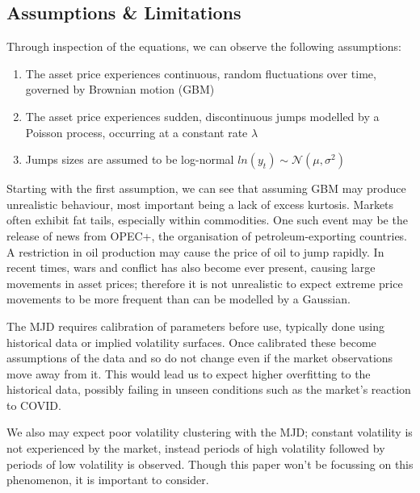 \documentclass[12pt]{article}
\newcommand{\newp}
    {
    \vskip 0.5cm 
  }
\numberwithin{equation}{section}
\begin{document}
\subsection{Assumptions \& Limitations}
Through inspection of the equations, we can observe the following assumptions\autocite{viewonmerton}:
\begin{enumerate}
\item The asset price experiences continuous, random fluctuations over time,
  governed by Brownian motion (GBM)
\item The asset price experiences sudden, discontinuous jumps modelled by a 
  Poisson process, occurring at a constant rate $\lambda$
\item Jumps sizes are assumed to be log-normal $ln(y_t) \sim \mathcal{N}(\mu,\sigma^2)$
\end{enumerate}
Starting with the first assumption, we can see that assuming GBM may produce
unrealistic behaviour, most important being a lack of excess kurtosis.
Markets 
often exhibit fat tails, especially within commodities. One such event may 
be the release of news from OPEC+, the organisation of petroleum-exporting 
countries. A restriction in oil production may cause the price of oil to jump 
rapidly. In recent times, wars and conflict has also become 
ever present, causing large movements in asset prices; therefore it is not 
unrealistic to
expect extreme price movements to be more frequent than can be modelled 
by a Gaussian.
\newp
The MJD requires calibration of parameters before use, typically done using historical 
data or implied volatility surfaces. Once calibrated these become assumptions of 
the data and so do not change even if the market observations move away from it. 
This would lead us to expect higher overfitting to the historical data, possibly 
failing in unseen conditions such as the market's reaction to COVID. 
\newp 
We also may expect poor volatility clustering with the MJD; constant volatility 
is not experienced by the market, instead periods of high volatility followed 
by periods of low volatility is observed. Though this paper won't be focussing 
on this phenomenon, it is important to consider.
\end{document}
